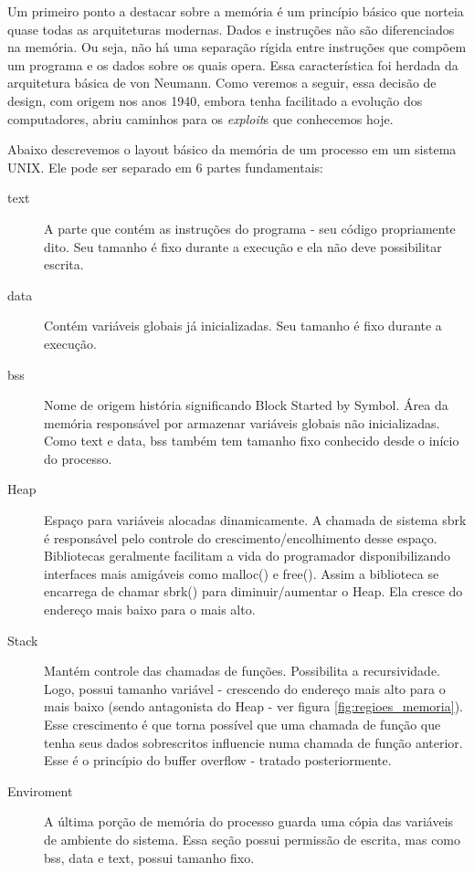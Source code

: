 	Um primeiro ponto a destacar sobre a memória é um princípio básico que norteia
	quase todas as arquiteturas modernas. Dados e instruções não são diferenciados na memória.
	Ou seja, não há uma separação rígida entre instruções que compõem um programa e os dados
	sobre os quais opera. Essa característica foi herdada da arquitetura básica de von Neumann.
	Como veremos a seguir, essa decisão de design, com origem nos anos 1940, embora tenha
	facilitado a evolução dos computadores, abriu caminhos para os \textsl{exploit}s que conhecemos hoje. 

	Abaixo descrevemos o layout básico da memória de um processo em um sistema UNIX.
	Ele pode ser separado em 6 partes fundamentais:
	\begin{description}
		\item[text]
			A parte que contém as instruções do programa - seu código propriamente dito.
			Seu tamanho é fixo durante a execução e ela não deve possibilitar escrita.
		\item[data]
			Contém variáveis globais já inicializadas. Seu tamanho é fixo durante a execução.
		\item[bss]
			Nome de origem história significando Block Started by Symbol. Área da memória responsável
			por armazenar variáveis globais	não inicializadas. Como text e data, bss também tem tamanho 
			fixo conhecido desde o início do processo. 
		\item[Heap]
			Espaço para variáveis alocadas dinamicamente. A chamada de sistema sbrk é responsável
			pelo controle do crescimento/encolhimento desse espaço. Bibliotecas geralmente facilitam a vida
			do programador disponibilizando interfaces mais amigáveis como malloc() e free(). Assim a biblioteca
			se encarrega de chamar sbrk() para diminuir/aumentar o Heap. Ela cresce do endereço mais baixo para o
			mais alto.
		\item[Stack]
			Mantém controle das chamadas de funções. Possibilita a recursividade. Logo, possui
			tamanho variável - crescendo do endereço mais alto para o mais baixo (sendo antagonista do Heap - ver
			figura \ref{fig:regioes_memoria}). 
			Esse crescimento é que torna possível que uma chamada de função que tenha seus dados
			sobrescritos influencie numa chamada de função anterior. Esse é o princípio do buffer overflow - tratado
			posteriormente.
		\item[Enviroment]
			A última porção de memória do processo guarda uma cópia das variáveis de ambiente do sistema.
			Essa seção possui permissão de escrita, mas como bss, data e text, possui tamanho fixo.
	\end{description}

